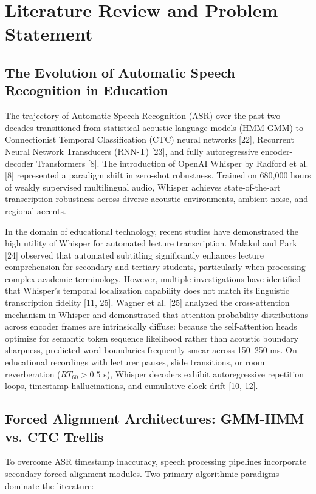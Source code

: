 \documentclass[12pt,a4paper]{article}
\begin{document}
\section{Literature Review and Problem Statement}

\subsection{The Evolution of Automatic Speech Recognition in Education}
The trajectory of Automatic Speech Recognition (ASR) over the past two decades transitioned from statistical acoustic-language models (HMM-GMM) to Connectionist Temporal Classification (CTC) neural networks [22], Recurrent Neural Network Transducers (RNN-T) [23], and fully autoregressive encoder-decoder Transformers [8]. The introduction of OpenAI Whisper by Radford et al. [8] represented a paradigm shift in zero-shot robustness. Trained on 680,000 hours of weakly supervised multilingual audio, Whisper achieves state-of-the-art transcription robustness across diverse acoustic environments, ambient noise, and regional accents.

In the domain of educational technology, recent studies have demonstrated the high utility of Whisper for automated lecture transcription. Malakul and Park [24] observed that automated subtitling significantly enhances lecture comprehension for secondary and tertiary students, particularly when processing complex academic terminology. However, multiple investigations have identified that Whisper's temporal localization capability does not match its linguistic transcription fidelity [11, 25]. Wagner et al. [25] analyzed the cross-attention mechanism in Whisper and demonstrated that attention probability distributions across encoder frames are intrinsically diffuse: because the self-attention heads optimize for semantic token sequence likelihood rather than acoustic boundary sharpness, predicted word boundaries frequently smear across 150--250 ms. On educational recordings with lecturer pauses, slide transitions, or room reverberation ($RT_{60} > 0.5$ s), Whisper decoders exhibit autoregressive repetition loops, timestamp hallucinations, and cumulative clock drift [10, 12].

\subsection{Forced Alignment Architectures: GMM-HMM vs. CTC Trellis}
To overcome ASR timestamp inaccuracy, speech processing pipelines incorporate secondary forced alignment modules. Two primary algorithmic paradigms dominate the literature:
\end{document}
